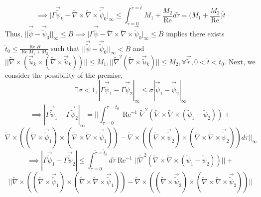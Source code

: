 \documentclass{article}
\begin{document}
\begin{equation*}
\implies \bigg|\Gamma \vec{\tilde{\psi}}_k - \tilde{\nabla}\times\tilde{\nabla}\times\vec{\tilde{\psi}}_0\bigg|_{\infty} \le \int_{\tilde{\tau} = 0}^{\tilde{\tau} = \tilde{t}} M_1 + \frac{M_2}{\operatorname{Re}}d\tilde{\tau} = \bigg(M_1 + \frac{M_2}{\operatorname{Re}}\bigg)\tilde{t}
\end{equation*}
Thus, $||\vec{\tilde{\psi}}-\vec{\tilde{\psi}}_0||_{\infty}\le B \implies \bigg|\Gamma \vec{\tilde{\psi}} - \tilde{\nabla}\times\tilde{\nabla}\times\vec{\tilde{\psi}}_0\bigg|_{\infty}\le B$ implies there exists $\tilde{t}_0 \le \frac{\operatorname{Re} B}{\operatorname{Re}M_1+M_2}$ such that $||\vec{\tilde{\psi}}-\vec{\tilde{\psi}}_0||_{\infty}<B$ and $\bigg|\bigg|\tilde{\nabla} \times (\vec{\tilde{u}}_k\times(\tilde{\nabla} \times \vec{\tilde{u}}_k))\bigg|\bigg| \le M_1, \bigg|\bigg|\tilde{\nabla}^2(\tilde{\nabla}\times\vec{\tilde{u}}_k)\bigg|\bigg| \le M_2, \forall \vec{\tilde{r}}, 0 < \tilde{t} < \tilde{t}_0$. Next, we consider the possibility of the premise,
\begin{equation*}
\exists \sigma < 1, |\Gamma\vec{\tilde{\psi}}_1 - \Gamma\vec{\tilde{\psi}}_2|_{\infty} \le \sigma |\vec{\tilde{\psi}}_1 - \vec{\tilde{\psi}}_2|_{\infty}
\end{equation*}
\begin{equation*}
\implies |\Gamma\vec{\tilde{\psi}}_1 - \Gamma\vec{\tilde{\psi}}_2|_{\infty} = \bigg|\bigg|\int_{\tilde{\tau}=0}^{\tilde{\tau}=\tilde{t}_0}\operatorname{Re}^{-1}\tilde{\nabla}^2(\tilde{\nabla}\times\tilde{\nabla}
\times(\tilde{\psi}_1-\tilde{\psi}_2)) + 
\end{equation*}
\begin{equation*}
\tilde{\nabla} \times ((\tilde{\nabla} \times \vec{\tilde{\psi}}_1)\times(\tilde{\nabla} \times \tilde{\nabla} \times \vec{\tilde{\psi}}_1)) - \tilde{\nabla} \times ((\tilde{\nabla} \times \vec{\tilde{\psi}}_2)\times(\tilde{\nabla} \times \tilde{\nabla} \times \vec{\tilde{\psi}}_2))d\tilde{\tau}\bigg|\bigg|_{\infty}
\end{equation*}
\begin{equation*}
\implies |\Gamma\vec{\tilde{\psi}}_1 - \Gamma\vec{\tilde{\psi}}_2| \le \int_{\tilde{\tau}=0}^{\tilde{\tau} = \tilde{t}_0} d\tilde{\tau} \operatorname{Re}^{-1} \bigg|\bigg|\tilde{\nabla}^2(\tilde{\nabla}\times\tilde{\nabla}
\times(\tilde{\psi}_1-\tilde{\psi}_2))\bigg|\bigg| + 
\end{equation*}
\begin{equation*}
\bigg|\bigg|\tilde{\nabla} \times ((\tilde{\nabla} \times \vec{\tilde{\psi}}_1)\times(\tilde{\nabla} \times \tilde{\nabla} \times \vec{\tilde{\psi}}_1)) - \tilde{\nabla} \times ((\tilde{\nabla} \times \vec{\tilde{\psi}}_2)\times(\tilde{\nabla} \times \tilde{\nabla} \times \vec{\tilde{\psi}}_2))\bigg|\bigg|
\end{equation*}
\end{document}
